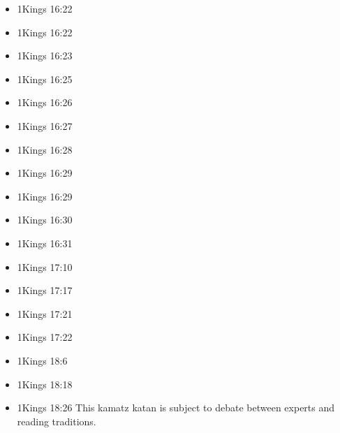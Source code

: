 \documentclass[14pt]{book}
\begin{document}
\begin{multicols}{2}
\begin{itemize}
											\item 1Kings 16:22
											
											\item 1Kings 16:22
											
											\item 1Kings 16:23
											
											\item 1Kings 16:25
											
											\item 1Kings 16:26
											
											\item 1Kings 16:27
											
											\item 1Kings 16:28
											
											\item 1Kings 16:29
											
											\item 1Kings 16:29
											
											\item 1Kings 16:30
											
											\item 1Kings 16:31
											
											\item 1Kings 17:10
											
											\item 1Kings 17:17
											
											\item 1Kings 17:21
											
											\item 1Kings 17:22
											
											\item 1Kings 18:6
											
											\item 1Kings 18:18
											
											\item 1Kings 18:26 This kamatz katan is subject to debate between experts and reading traditions.
											

\end{itemize}
\end{multicols}
\end{document}

